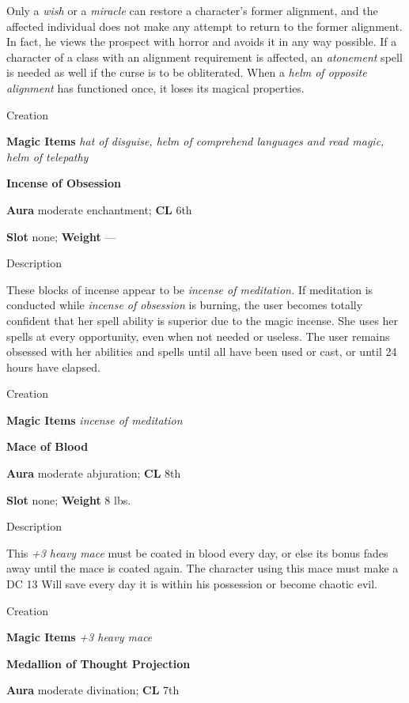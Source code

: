 Only a \textit{wish} or a \textit{miracle} can restore a character's former alignment, and the affected individual does not make any attempt to return to the former alignment. In fact, he views the prospect with horror and avoids it in any way possible. If a character of a class with an alignment requirement is affected, an \textit{atonement} spell is needed as well if the curse is to be obliterated. When a \textit{helm of opposite alignment} has functioned once, it loses its magical properties. 
				
Creation
				
\textbf{Magic Items}\textit{ hat of disguise, helm of comprehend languages and read magic, helm of telepathy}
				
\textbf{Incense of Obsession}
				
\textbf{Aura} moderate enchantment; \textbf{CL} 6th
				
\textbf{Slot} none; \textbf{Weight }---
				
Description
				
These blocks of incense appear to be \textit{incense of meditation. }If meditation is conducted while \textit{incense of obsession }is burning, the user becomes totally confident that her spell ability is superior due to the magic incense. She uses her spells at every opportunity, even when not needed or useless. The user remains obsessed with her abilities and spells until all have been used or cast, or until 24 hours have elapsed. 
				
Creation
				
\textbf{Magic Items}\textit{ incense of meditation}
				
\textbf{Mace of Blood}
				
\textbf{Aura} moderate abjuration; \textbf{CL} 8th
				
\textbf{Slot} none; \textbf{Weight }8 lbs.
				
Description
				
This \textit{+3 heavy mace }must be coated in blood every day, or else its bonus fades away until the mace is coated again. The character using this mace must make a DC 13 Will save every day it is within his possession or become chaotic evil. 
				
Creation
				
\textbf{Magic Items}\textit{ +3 heavy mace}
				
\textbf{Medallion of Thought Projection}
				
\textbf{Aura} moderate divination; \textbf{CL} 7th
				
